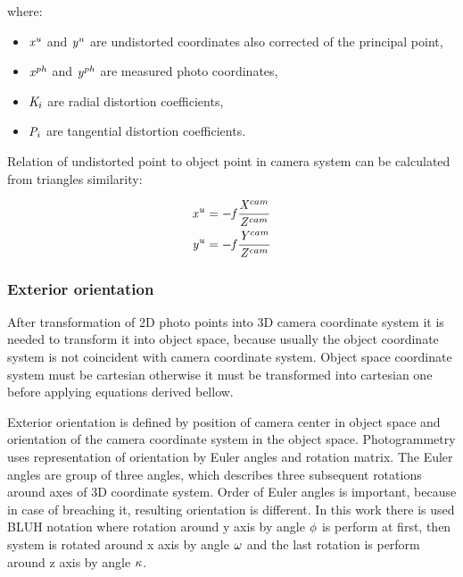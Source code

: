 \documentclass[a4paper,12pt]{article}
\newcommand{\escal}[1]{
{\it #1}
}
\begin{document}
where:


\begin{itemize}
  \item $\escal{x}^{u}$ and $\escal{y}^{u}$  are undistorted coordinates also corrected of the principal point,
  \item $\escal{x}^{ph}$ and $\escal{y}^{ph}$ are measured photo coordinates,
  \item $\escal{K}_{i}$ are radial distortion coefficients,
  \item $\escal{P}_{i}$ are tangential distortion coefficients.
\end{itemize}


Relation of undistorted point to object point in camera system can be calculated from 
triangles similarity:

\begin{equation}
\begin{split}
&\escal{x}^{u} =  - \escal{f} \frac{\escal{X}^{cam}}{\escal{Z}^{cam}}   \\
&\escal{y}^{u} = - \escal{f} \frac{\escal{Y}^{cam}}{\escal{Z}^{cam}} 
\end{split}
\end{equation}


\subsubsection{Exterior orientation}
\label{sec:eo}

After transformation of 2D photo points into 3D camera coordinate system it is needed to transform it into object space,
because usually the object coordinate system is not coincident with camera coordinate system. 
Object space coordinate system must be cartesian otherwise it must be transformed into cartesian one before applying equations 
derived bellow. 


Exterior orientation is defined by position of camera center in object space and orientation of the camera coordinate system in the object space.
Photogrammetry uses representation of orientation by Euler angles and rotation matrix.
The Euler angles are group of three angles, which describes three subsequent rotations
 around axes of 3D coordinate system. 
 Order of Euler angles is important, because in case of breaching it, resulting orientation is different. 
 In this work there is used BLUH notation \cite{baumker2001new} where rotation around y axis by angle $\escal{\phi}$ is 
 perform at first, then system is rotated around x axis  by angle $\escal{\omega}$ and
 the last rotation is perform around z axis by angle $\escal{\kappa}$.
 
\end{document}
